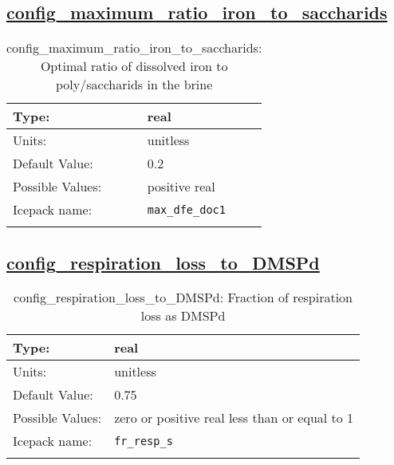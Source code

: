 \subsection[config\_maximum\_ratio\_iron\_to\_saccharids]{\hyperref[sec:nm_tab_biogeochemistry]{config\_maximum\_ratio\_iron\_to\_saccharids}}
\label{subsec:nm_sec_config_maximum_ratio_iron_to_saccharids}
\begin{center}
\begin{longtable}{| p{2.0in} || p{4.0in} |}
    \hline
    Type: & real \\
    \hline
    Units: & \si{unitless} \\
    \hline
    Default Value: & 0.2 \\
    \hline
    Possible Values: & positive real \\
    \hline
    Icepack name: & \verb+max_dfe_doc1+ \\
    \hline
    \caption{config\_maximum\_ratio\_iron\_to\_saccharids: Optimal ratio of dissolved iron to poly/saccharids in the brine}
\end{longtable}
\end{center}
\subsection[config\_respiration\_loss\_to\_DMSPd]{\hyperref[sec:nm_tab_biogeochemistry]{config\_respiration\_loss\_to\_DMSPd}}
\label{subsec:nm_sec_config_respiration_loss_to_DMSPd}
\begin{center}
\begin{longtable}{| p{2.0in} || p{4.0in} |}
    \hline
    Type: & real \\
    \hline
    Units: & \si{unitless} \\
    \hline
    Default Value: & 0.75 \\
    \hline
    Possible Values: & zero or positive real less than or equal to 1 \\
    \hline
    Icepack name: & \verb+fr_resp_s+ \\
    \hline
    \caption{config\_respiration\_loss\_to\_DMSPd: Fraction of respiration loss as DMSPd}
\end{longtable}
\end{center}
